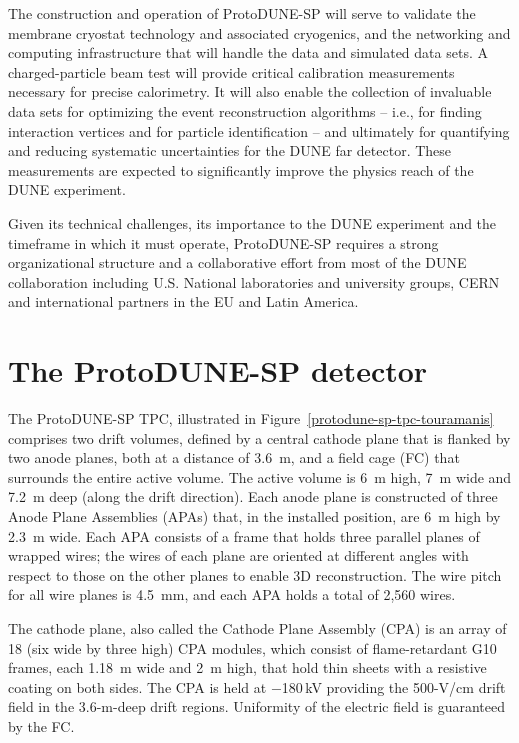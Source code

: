 The construction and operation of ProtoDUNE-SP will serve to validate the membrane cryostat technology and associated cryogenics, and the networking and computing infrastructure that will handle the data and simulated data sets.
A charged-particle beam test will provide critical calibration measurements necessary for precise calorimetry. It will also enable the collection of invaluable data sets for optimizing the event reconstruction algorithms -- i.e., for finding interaction vertices and for particle identification -- and ultimately for quantifying and reducing systematic uncertainties for the DUNE far detector. These measurements are expected to significantly improve the physics reach of the DUNE experiment.

Given its technical challenges, its importance to the DUNE experiment and the timeframe in which it must operate, ProtoDUNE-SP requires a strong organizational structure and a collaborative effort from most of the DUNE collaboration including U.S. National laboratories and university groups, CERN and international partners in the EU and Latin America. 


\section{The ProtoDUNE-SP detector}
\label{intro:detector}

The ProtoDUNE-SP TPC, illustrated in Figure~\ref{protodune-sp-tpc-touramanis} comprises two drift volumes, defined by  a central cathode plane that is flanked by two anode planes, both at a distance of 3.6~m, and a field cage (FC) that surrounds the entire active volume. The active volume is 6~m high, 7~m wide and 7.2~m deep (along the drift direction).
Each anode plane is constructed of three Anode Plane Assemblies (APAs) that, in the installed position, are  6~m high by 2.3~m wide. Each APA consists of a frame that holds three parallel planes of wrapped wires; the wires of each plane are
oriented at different angles with respect to those on the other planes to enable 3D reconstruction.  The wire pitch for all wire planes is 4.5~mm, and each APA holds a total of 2,560 wires. 

The cathode plane, also called the Cathode Plane Assembly (CPA) is an array of 18 (six wide by three high) CPA modules, which consist of flame-retardant G10 frames, each 1.18~m wide and 2~m high, that hold thin sheets with a resistive coating on both sides. 
The CPA is held at $-$180\,kV providing the 500-V/cm drift field in the 3.6-m-deep drift regions. 
Uniformity of the electric field is guaranteed by the FC.
 
